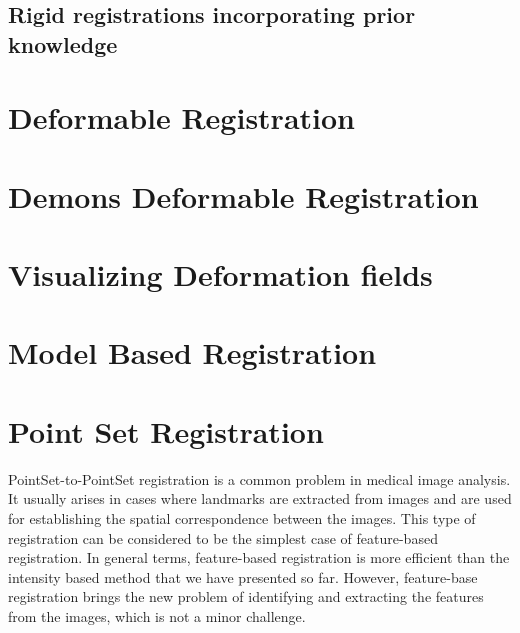 \subsection{Rigid registrations incorporating prior knowledge}
\label{sec:RegistrationCentered2DTransform}
\ifitkFullVersion

\fi


\clearpage

\section{Deformable Registration}
\label{sec:DeformableRegistration}
\ifitkFullVersion

\fi

\clearpage

\section{Demons Deformable Registration}
\label{sec:DemonsDeformableRegistration}
\ifitkFullVersion

\fi

\section{Visualizing Deformation fields}
\label{sec:VisualizingDeformationFields}
\ifitkFullVersion

\fi

\ifitkFullVersion

\fi


\clearpage



\section{Model Based Registration}
\label{sec:ModelBasedRegistration}
\ifitkFullVersion

\fi


\section{Point Set Registration}
\label{sec:PointSetRegistration}

PointSet-to-PointSet registration is a common problem in medical image
analysis. It usually arises in cases where landmarks are extracted from images
and are used for establishing the spatial correspondence between the images.
This type of registration can be considered to be the simplest case of
feature-based registration. In general terms, feature-based registration is
more efficient than the intensity based method that we have presented so far.
However, feature-base registration brings the new problem of identifying and
extracting the features from the images, which is not a minor challenge.

